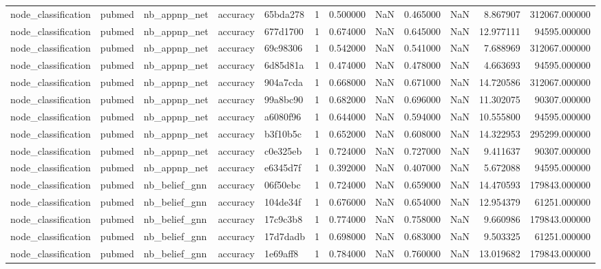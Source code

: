 \begin{tabular}{lllllrrrrrrr}
node_classification & pubmed & nb_appnp_net & accuracy & 65bda278 & 1 & 0.500000 & NaN & 0.465000 & NaN & 8.867907 & 312067.000000 \\
node_classification & pubmed & nb_appnp_net & accuracy & 677d1700 & 1 & 0.674000 & NaN & 0.645000 & NaN & 12.977111 & 94595.000000 \\
node_classification & pubmed & nb_appnp_net & accuracy & 69c98306 & 1 & 0.542000 & NaN & 0.541000 & NaN & 7.688969 & 312067.000000 \\
node_classification & pubmed & nb_appnp_net & accuracy & 6d85d81a & 1 & 0.474000 & NaN & 0.478000 & NaN & 4.663693 & 94595.000000 \\
node_classification & pubmed & nb_appnp_net & accuracy & 904a7cda & 1 & 0.668000 & NaN & 0.671000 & NaN & 14.720586 & 312067.000000 \\
node_classification & pubmed & nb_appnp_net & accuracy & 99a8bc90 & 1 & 0.682000 & NaN & 0.696000 & NaN & 11.302075 & 90307.000000 \\
node_classification & pubmed & nb_appnp_net & accuracy & a6080f96 & 1 & 0.644000 & NaN & 0.594000 & NaN & 10.555800 & 94595.000000 \\
node_classification & pubmed & nb_appnp_net & accuracy & b3f10b5c & 1 & 0.652000 & NaN & 0.608000 & NaN & 14.322953 & 295299.000000 \\
node_classification & pubmed & nb_appnp_net & accuracy & c0e325eb & 1 & 0.724000 & NaN & 0.727000 & NaN & 9.411637 & 90307.000000 \\
node_classification & pubmed & nb_appnp_net & accuracy & e6345d7f & 1 & 0.392000 & NaN & 0.407000 & NaN & 5.672088 & 94595.000000 \\
node_classification & pubmed & nb_belief_gnn & accuracy & 06f50ebc & 1 & 0.724000 & NaN & 0.659000 & NaN & 14.470593 & 179843.000000 \\
node_classification & pubmed & nb_belief_gnn & accuracy & 104de34f & 1 & 0.676000 & NaN & 0.654000 & NaN & 12.954379 & 61251.000000 \\
node_classification & pubmed & nb_belief_gnn & accuracy & 17c9c3b8 & 1 & 0.774000 & NaN & 0.758000 & NaN & 9.660986 & 179843.000000 \\
node_classification & pubmed & nb_belief_gnn & accuracy & 17d7dadb & 1 & 0.698000 & NaN & 0.683000 & NaN & 9.503325 & 61251.000000 \\
node_classification & pubmed & nb_belief_gnn & accuracy & 1e69aff8 & 1 & 0.784000 & NaN & 0.760000 & NaN & 13.019682 & 179843.000000 \\

\end{tabular}
